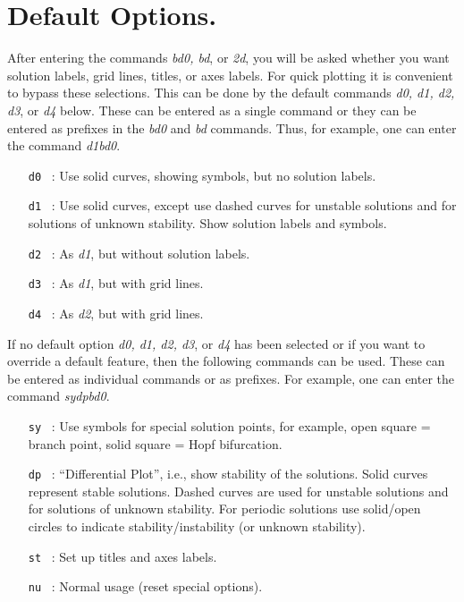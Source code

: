 \documentclass[12pt]{report}
\begin{document}
\section{ Default Options.} \label{sec:PLAUT_default}
After entering the commands {\it bd0, bd}, or {\it 2d}, you will be asked whether you 
want solution labels, grid lines, titles, or axes labels.
For quick plotting it is convenient to bypass these selections.
This can be done by the default commands {\it d0, d1, d2, d3}, or {\it d4} below.
These can be entered as a single command 
or they can be entered as prefixes in the {\it bd0} and {\it bd} commands. 
Thus, for example, one can enter the command {\it d1bd0}.  

\begin{itemize}
\item[\tt d0]~:  Use solid curves, showing symbols, but no solution labels. 
\item[\tt d1]~:  Use solid curves, except use dashed curves for unstable
  solutions and for solutions of unknown stability.
  Show solution labels and symbols.
\item[\tt d2]~:  As {\it d1}, but without solution labels.
\item[\tt d3]~:  As {\it d1}, but with grid lines.
\item[\tt d4]~:  As {\it d2}, but with grid lines.
\end{itemize}

If no default option {\it d0, d1, d2, d3}, or {\it d4} has been selected 
or if you want to override a default feature,
then the following commands can be used.
These can be entered as individual commands or as prefixes.
For example, one can enter the command {\it sydpbd0}.

\begin{itemize}
\item[\tt sy]~:  Use symbols for special solution points, for example,
  open square = branch point,
  solid square = Hopf bifurcation.
\item[\tt dp]~:  ``Differential Plot'', i.e., show stability of the 
  solutions. Solid curves represent stable solutions.
  Dashed curves are used for unstable
  solutions and for solutions of unknown stability.
  For periodic solutions use solid/open circles
  to indicate stability/instability (or unknown
  stability).
\item[\tt st]~:  Set up titles and axes labels. 
\item[\tt nu]~:  Normal usage (reset special options). 
\end{itemize}
\end{document}
